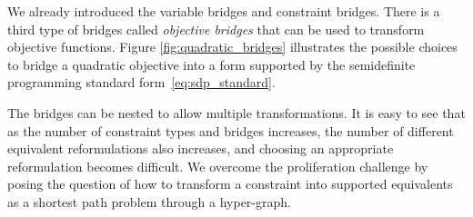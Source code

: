 \documentclass[11pt,twoside,a4paper,openright]{uclouvain-thesis}
\begin{document}
We already introduced the variable bridges and constraint bridges.
There is a third type of bridges called \emph{objective bridges} that can be used to transform objective functions.
Figure \ref{fig:quadratic_bridges} illustrates the possible choices to bridge a quadratic objective into a form supported by the semidefinite programming standard form~\eqref{eq:sdp_standard}.

The bridges can be nested to allow multiple transformations.
It is easy to see that as the number of constraint types and bridges increases, the number of different equivalent reformulations also increases, and choosing an appropriate reformulation becomes difficult.
We overcome the proliferation challenge by posing the question of how to transform a constraint into supported equivalents as a shortest path problem through a hyper-graph.
\end{document}
